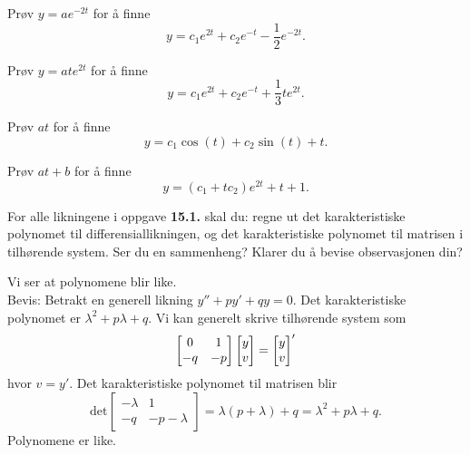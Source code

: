 \begin{losning}
	\begin{punkt} Prøv $y=a e^{-2t}$ for å finne
		$$y=c_1 e^{2t}+c_2 e^{-t}-\frac{1}{2}e^{-2t}.$$
	\end{punkt}

	\begin{punkt} Prøv $y=a t e^{2t}$ for å finne
		$$y=c_1 e^{2t}+c_2 e^{-t}+\frac{1}{3} t e^{2t}.$$
	\end{punkt}
	
	\begin{punkt} Prøv $a t$ for å finne
		$$y=c_1\cos(t)+ c_2 \sin (t)+t.$$
	\end{punkt}
	
	\begin{punkt} Prøv $at+b$ for å finne
		$$y=(c_1+tc_2)e^{2t}+t+1.$$
	\end{punkt}
	
\end{losning}

\begin{oppgave}
For alle likningene i oppgave \textbf{15.1.} skal du: regne ut det karakteristiske polynomet til differensiallikningen, og det karakteristiske polynomet til matrisen i tilhørende system. Ser du en sammenheng? Klarer du å bevise observasjonen din?
\end{oppgave}

\begin{losning}
Vi ser at polynomene blir like.
\\

Bevis: Betrakt en generell likning $y''+py'+qy=0$. Det karakteristiske polynomet er $\lambda ^2+p\lambda+q$. Vi kan generelt skrive tilhørende system som $$\begin{bmatrix}
0 & 1\\
-q & -p
\end{bmatrix} \begin{bmatrix} y \\ v \end{bmatrix}=\begin{bmatrix} y \\ v \end{bmatrix} '
$$ hvor $v=y'$. Det karakteristiske polynomet til matrisen blir $$
\text{det}\begin{bmatrix}
-\lambda & 1\\
-q & -p-\lambda
\end{bmatrix}=\lambda(p+\lambda)+q=\lambda^2+p\lambda+q.
$$Polynomene er like.
\end{losning}

